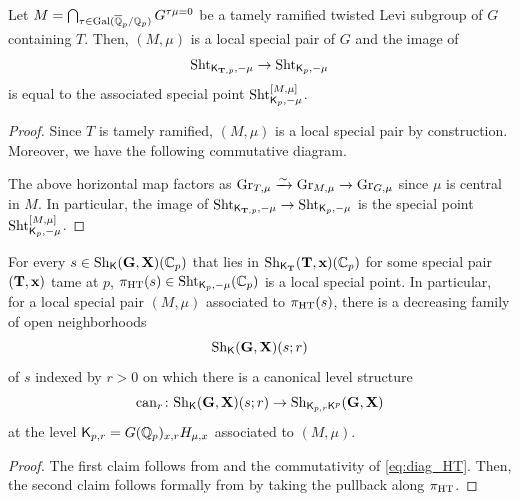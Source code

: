 \documentclass[12pt,reqno]{amsart}
\begin{document}
\begin{prop} \label{prop:image_extremal}
    Let $M = \bigcap_{\tau \in {\operatorname{Gal}}({\overline{\mathbb{Q}}}_p / \mathbb{Q}_p)} G^{\tau \mu = 0}$ be a tamely ramified twisted Levi subgroup of $G$ containing $T$. Then, $(M, \mu)$ is a local special pair of $G$ and the image of 
    \[
        {\operatorname{Sht}}_{{\mathsf{K}}_{\mathbf{T}, p}, -\mu} \to {\operatorname{Sht}}_{{\mathsf{K}}_{p}, -\mu}
    \]
    is equal to the associated special point ${\operatorname{Sht}}_{{\mathsf{K}}_{p}, -\mu}^{[M, \mu]}$. 
\end{prop}
\begin{proof}
    Since $T$ is tamely ramified, $(M, \mu)$ is a local special pair by construction. Moreover, we have the following commutative diagram. 
    \begin{center}
    \end{center}
    The above horizontal map factors as ${\operatorname{Gr}}_{T, \mu} \xrightarrow{\sim} {\operatorname{Gr}}_{M, \mu} \to {\operatorname{Gr}}_{G, \mu}$ since $\mu$ is central in $M$. In particular, the image of ${\operatorname{Sht}}_{{\mathsf{K}}_{\mathbf{T}, p}, -\mu} \to {\operatorname{Sht}}_{{\mathsf{K}}_{p}, -\mu}$ is the special point ${\operatorname{Sht}}_{{\mathsf{K}}_{p}, -\mu}^{[M, \mu]}$. 
\end{proof}

\begin{cor} \label{cor:canonical_level_structure}
    For every $s \in {\operatorname{Sh}}_{{\mathsf{K}}}(\mathbf{G}, \mathbf{X})(\mathbb{C}_p)$ that lies in ${\operatorname{Sh}}_{{\mathsf{K}}_{\mathbf{T}}}(\mathbf{T}, \mathbf{x})(\mathbb{C}_p)$ for some special pair $(\mathbf{T}, \mathbf{x})$ tame at $p$, $\pi_{\operatorname{HT}}(s) \in {\operatorname{Sht}}_{{\mathsf{K}}_p, -\mu}(\mathbb{C}_p)$ is a local special point. In particular, for a local special pair $(M, \mu)$ associated to $\pi_{\operatorname{HT}}(s)$, there is a decreasing family of open neighborhoods 
    \[
        {\operatorname{Sh}}_{{\mathsf{K}}}(\mathbf{G}, \mathbf{X})(s; r)
    \]
    of $s$ indexed by $r > 0$ on which there is a canonical level structure
    \[
        {\operatorname{can}}_r \colon {\operatorname{Sh}}_{{\mathsf{K}}}(\mathbf{G}, \mathbf{X})(s; r) \to {\operatorname{Sh}}_{{\mathsf{K}}_{p, r} {\mathsf{K}}^p}(\mathbf{G}, \mathbf{X}) 
    \]
    at the level ${\mathsf{K}}_{p, r} = G(\mathbb{Q}_p)_{x, r} H_{\mu, x}$ associated to $(M, \mu)$. 
\end{cor}
\begin{proof}
    The first claim follows from  and the commutativity of \eqref{eq:diag_HT}. Then, the second claim follows formally from  by taking the pullback along $\pi_{{\operatorname{HT}}}$.
\end{proof}
\end{document}
